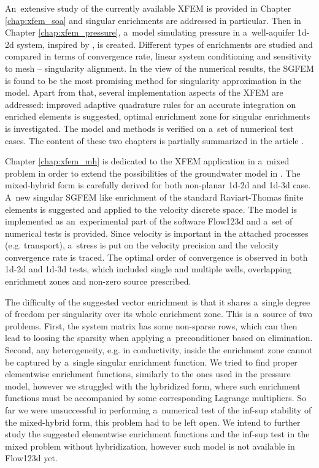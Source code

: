 \documentclass[bibliography=totocnumbered,dvipsnames,FM,Dis, EN]{tulthesis_autoreferat}
\begin{document}
An~extensive study of the currently available XFEM \cite{fries_xfem_overview_2010, babuska_stable_2012} is provided 
in Chapter \ref{chap:xfem_soa} and singular enrichments are addressed in particular. 
Then in Chapter \ref{chap:xfem_pressure}, a~model simulating pressure in a~well-aquifer 1d-2d system,
inspired by \cite{gracie_modelling_2010, craig_using_2011}, is created.
Different types of enrichments are studied and compared in terms of
convergence rate, linear system conditioning and sensitivity to mesh -- singularity alignment.
In the view of the numerical results, the SGFEM is found to be the most promising method
for singularity approximation in the model.
Apart from that, several implementation aspects of the XFEM are addressed: improved adaptive quadrature rules
for an accurate integration on enriched elements is suggested, optimal enrichment zone
for singular enrichments is investigated. 
The model and methods is verified on a~set of numerical test cases.
The content of these two chapters is partially summarized in the article \cite{exner_2016}.


Chapter \ref{chap:xfem_mh} is dedicated to the XFEM application in a~mixed problem
in order to extend the possibilities of the groundwater model in \cite{sistek_bddc_2015, flow123d}.
The mixed-hybrid form is carefully derived for both non-planar 1d-2d and 1d-3d case.
A~new singular SGFEM like enrichment of the standard Raviart-Thomas finite elements is suggested
and applied to the velocity discrete space.
The model is implemented as an~experimental part of the software Flow123d
and a~set of numerical tests is provided.
Since velocity is important in the attached processes (e.g. transport),
a~stress is put on the velocity precision and the velocity convergence rate is traced.
The optimal order of convergence is observed in both 1d-2d and 1d-3d tests,
which included single and multiple wells, overlapping enrichment zones and non-zero source prescribed.

The difficulty of the suggested vector enrichment is that it shares a~single degree of freedom per singularity
over its whole enrichment zone. This is a~source of two problems. First, the system matrix has some non-sparse rows,
which can then lead to loosing the sparsity when applying a~preconditioner based on elimination.
Second, any heterogeneity, e.g. in conductivity, inside the enrichment zone cannot be captured by
a~single singular enrichment function.
We tried to find proper elementwise enrichment functions, similarly to the ones used in the pressure model,
however we struggled with the hybridized form, where such enrichment functions must be accompanied
by some corresponding Lagrange multipliers.
So far we were unsuccessful in performing a~numerical test of the inf-sup stability
of the mixed-hybrid form, this problem had to be left open.
We intend to further study the suggested elementwise enrichment functions and the inf-sup test in the mixed problem without hybridization,
however such model is not available in Flow123d yet.
\end{document}
